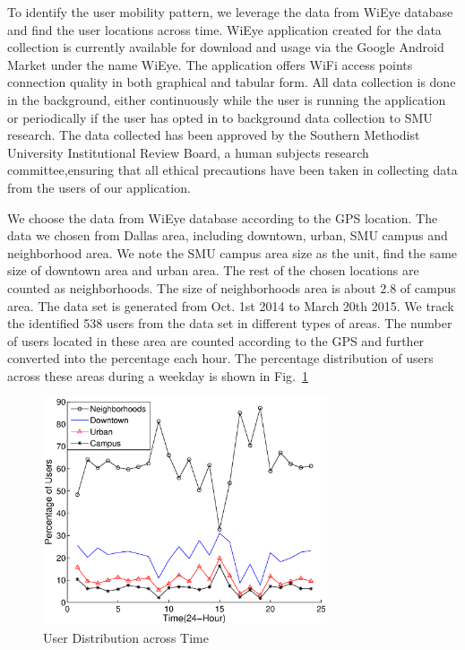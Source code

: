 To identify the user mobility pattern, we leverage the data from WiEye database and find the user locations across time.
WiEye application created for the data collection is currently available for download and usage via the Google Android 
Market under the name WiEye. The application offers WiFi access points connection quality in both graphical and tabular 
form. All data collection is done in the background, either continuously while the user is running the application or 
periodically if the user has opted in to background data collection to SMU research. 
The data collected has been approved by the Southern Methodist University Institutional Review Board, a human subjects 
research committee,ensuring that all ethical precautions have been taken in collecting data from the users of our 
application.



We choose the data from WiEye database according to the GPS location. The data we chosen from
Dallas area, including downtown, urban, SMU campus and neighborhood area. We note the SMU campus 
area size as the unit, find the same size of downtown area and urban area. The rest of the chosen 
locations are counted as neighborhoods. The size of neighborhoods area is about $2.8$ of campus 
area. The data set is generated from Oct. 1st 2014 to March 20th 2015. 
We track the identified 538 users from the data set in different types of areas. 
The number of users located in these area are counted according to the GPS and further converted into 
the percentage each hour. The percentage distribution of users across these areas during a weekday is shown 
in Fig.~\ref{fig:wieyeprocess}

\begin{figure}
\vspace{-0.0in}
\centering
\includegraphics[width=84mm]{figures/wieyeprocess}
\vspace{-0.1in}
\caption{User Distribution across Time}
\label{fig:wieyeprocess}
\vspace{-0.1in}
\end{figure}

